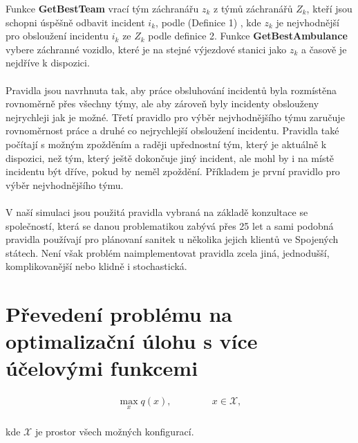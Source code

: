 Funkce \textbf{GetBestTeam} vrací tým záchranářu $z_k$ z týmů záchranářů $Z_k$, kteří jsou schopni úspěšně odbavit incident $i_k$, podle (Definice 1)
, kde $z_k$ je nejvhodnější pro obsloužení incidentu $i_k$ ze $Z_k$ podle definice 2. %
Funkce \textbf{GetBestAmbulance} vybere záchranné vozidlo, které je na stejné výjezdové stanici jako $z_k$ a časově je nejdříve k dispozici.
\\
\\
Pravidla jsou navrhnuta tak, aby práce obsluhování incidentů byla rozmístěna rovnoměrně přes všechny týmy, ale aby zároveň byly incidenty obslouženy nejrychleji jak je možné.
Třetí pravidlo pro výběr nejvhodnějšího týmu zaručuje rovnoměrnost práce a druhé co nejrychlejší obsloužení incidentu.
Pravidla také počítají s možným zpožděním a raději upřednostní tým, který je aktuálně k dispozici, než tým, který ještě dokončuje jiný incident, ale mohl by i na místě incidentu
být dříve, pokud by neměl zpoždění. Příkladem je první pravidlo pro výběr nejvhodnějšího týmu.
\\
\\
V naší simulaci jsou použitá pravidla vybraná na základě konzultace se společností, která se danou problematikou zabývá přes 25 let a sami podobná pravidla používají pro plánovaní sanitek
u několika jejich klientů ve Spojených státech.
Není však problém naimplementovat pravidla zcela jiná, jednodušší, komplikovanější nebo klidně i stochastická.

\section{Převedení problému na optimalizační úlohu s více účelovými funkcemi}

\begin{definice}
  \begin{align}
    \max_{x} q(x), \hspace{50pt} x \in \mathcal{X},
  \end{align}
  \\
  kde $\mathcal{X}$ je prostor všech možných konfigurací.
\end{definice}

